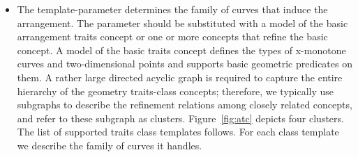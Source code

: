 \begin{itemize}
  \item The  template-parameter determines the
    family of curves that induce the arrangement. The parameter should
    be substituted with a model of the basic arrangement traits
    concept or one or more concepts that refine the basic concept. A
    model of the basic traits concept defines the types of x-monotone
    curves and two-dimensional points and supports basic geometric
    predicates on them. A rather large directed acyclic graph is
    required to capture the entire hierarchy of the geometry
    traits-class concepts; therefore, we typically use subgraphs to
    describe the refinement relations among closely related concepts,
    and refer to these subgraph as clusters. Figure~\ref{fig:atc}
    depicts four clusters. The list of supported traits class
    templates follows. For each class template we describe the family
    of curves it handles.


\end{itemize}
